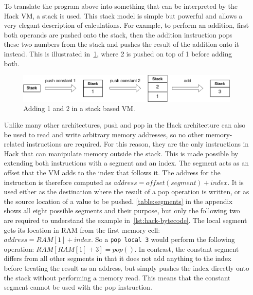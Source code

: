 To translate the program above into something that can be interpreted by the Hack VM, a stack is used.
This stack model is simple but powerful and allows a very elegant description of calculations.
For example, to perform an addition, first both operands are pushed onto the stack, then the addition instruction pops these two numbers from the stack and pushes the result of the addition onto it instead.
This is illustrated in~\cref{fig:stack-add}, where 2 is pushed on top of 1 before adding both.

\begin{center}
  \begin{figure}[ht]
    \centering
    \includegraphics[width=14cm]{fig/stack-add.png}
    \caption{Adding 1 and 2 in a stack based VM.}
    \label{fig:stack-add}
  \end{figure}
\end{center}

Unlike many other architectures, push and pop in the Hack architecture can also be used to read and write arbitrary memory addresses, so no other memory-related instructions are required. For this reason, they are the only instructions in Hack that can manipulate memory outside the stack.
This is made possible by extending both instructions with a segment and an index. The segment acts as an offset that the VM adds to the index that follows it.
The address for the instruction is therefore computed as \(address=offset(segment)+index\).
It is used either as the destination where the result of a pop operation is written, or as the source location of a value to be pushed.
\cref{table:segments} in the appendix shows all eight possible segments and their purpose, but only the following two are required to understand the example in~\cref{lst:hack-bytecode}.
The local segment gets its location in RAM from the first memory cell: \(address=RAM[1]+index\).
So a \verb+pop local 3+ would perform the following operation: \(RAM[RAM[1]+3] = pop()\).
In contrast, the constant segment differs from all other segments in that it does not add anything to the index before treating the result as an address, but simply pushes the index directly onto the stack without performing a memory read.
This means that the constant segment cannot be used with the pop instruction.


